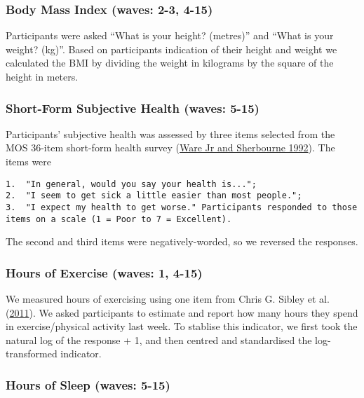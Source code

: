 \documentclass[
  singlecolumn]{report}
\begin{document}
\hypertarget{body-mass-index-waves-2-3-4-15}{%
\subsubsection{Body Mass Index (waves: 2-3,
4-15)}\label{body-mass-index-waves-2-3-4-15}}

Participants were asked ``What is your height? (metres)'' and ``What is
your weight? (kg)''. Based on participants indication of their height
and weight we calculated the BMI by dividing the weight in kilograms by
the square of the height in meters.

\hypertarget{short-form-subjective-health-waves-5-15}{%
\subsubsection{Short-Form Subjective Health (waves:
5-15)}\label{short-form-subjective-health-waves-5-15}}

Participants' subjective health was assessed by three items selected
from the MOS 36-item short-form health survey
(\protect\hyperlink{ref-warejr1992}{Ware Jr and Sherbourne 1992}). The
items were

\begin{verbatim}
1.  "In general, would you say your health is...";
2.  "I seem to get sick a little easier than most people.";
3.  "I expect my health to get worse." Participants responded to those items on a scale (1 = Poor to 7 = Excellent).
\end{verbatim}

The second and third items were negatively-worded, so we reversed the
responses.

\hypertarget{hours-of-exercise-waves-1-4-15}{%
\subsubsection{Hours of Exercise (waves: 1,
4-15)}\label{hours-of-exercise-waves-1-4-15}}

We measured hours of exercising using one item from Chris G. Sibley et
al. (\protect\hyperlink{ref-sibley2011}{2011}). We asked participants to
estimate and report how many hours they spend in exercise/physical
activity last week. To stablise this indicator, we first took the
natural log of the response + 1, and then centred and standardised the
log-transformed indicator.

\hypertarget{hours-of-sleep-waves-5-15}{%
\subsubsection{Hours of Sleep (waves:
5-15)}\label{hours-of-sleep-waves-5-15}}
\end{document}
